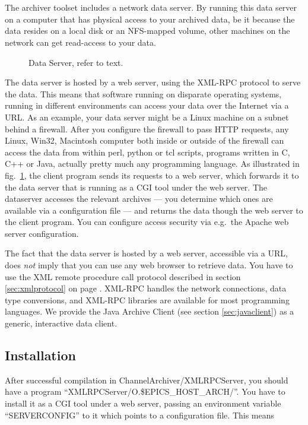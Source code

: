 \section{} \label{sec:dataserver}
The archiver toolset includes a network data server.
By running this data server on a computer that has
physical access to your archived data, be it because the data resides
on a local disk or an NFS-mapped volume, other machines
on the network can get read-access to your data.

\begin{figure}[htb]
\begin{center}
\end{center}
\caption{\label{fig:dataserver}Data Server, refer to text.}
\end{figure}

\noindent The data server is hosted by a web server, using the XML-RPC
protocol to serve the data. This means that software running on
disparate operating systems, running in different environments can
access your data over the Internet via a URL. As an example, your data
server might be a Linux machine on a subnet behind a firewall. After
you configure the firewall to pass HTTP requests, any Linux, Win32,
Macintosh computer both inside or outside of the firewall can access
the data from within perl, python or tcl scripts, programs written in
C, C++ or Java, actually pretty much any programming language. As
illustrated in fig.~\ref{fig:dataserver}, the client program sends its
requests to a web server, which forwards it to the data server that is
running as a CGI tool under the web server. The dataserver accesses
the relevant archives --- you determine which ones are available via a
configuration file --- and returns the data though the web server to
the client program.  You can configure access security via e.g.\ the
Apache web server configuration.

\NOTE The fact that the data server is hosted by a web server,
accessible via a URL, does \emph{not} imply that you can use any web browser
to retrieve data. You have to use the XML remote procedure call
protocol described in section \ref{sec:xmlprotocol} on page
\pageref{sec:xmlprotocol}. XML-RPC handles the network connections,
data type conversions, and XML-RPC libraries are available for most
programming languages.
We provide the Java Archive Client (see section \ref{sec:javaclient})
as a generic, interactive data client. 

\subsection{Installation} %
After successful compilation in ChannelArchiver/XMLRPCServer, you should
have a program
``XMLRPCServer/O.\$EPICS\_HOST\_ARCH/''.
You have to install it as a CGI tool under a web server, passing
an environment variable ``SERVERCONFIG'' to it which points
to a configuration file. This means

